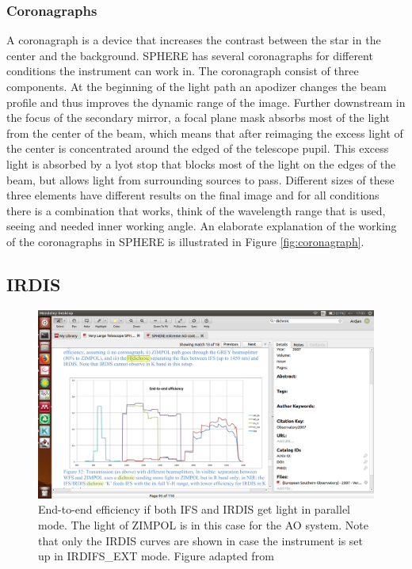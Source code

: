\documentclass[twoside,single,12pt]{lion-msc}
\begin{document}
\subsubsection{Coronagraphs}
A coronagraph is a device that increases the contrast between the star in the center and the background. SPHERE has several coronagraphs for different conditions the instrument can work in. The coronagraph consist of three components. At the beginning of the light path an apodizer changes the beam profile and thus improves the dynamic range of the image. Further downstream in the focus of the secondary mirror, a focal plane mask absorbs most of the light from the center of the beam, which means that after reimaging the excess light of the center is concentrated around the edged of the telescope pupil. This excess light is absorbed by a lyot stop that blocks most of the light on the edges of the beam, but allows light from surrounding sources to pass. Different sizes of these three elements have different results on the final image and for all conditions there is a combination that works, think of the wavelength range that is used, seeing and needed inner working angle. An elaborate explanation of the working of the coronagraphs in SPHERE is illustrated in Figure \ref{fig:coronagraph}.

\subsection{IRDIS}
\begin{figure}[!b]
\centering
\includegraphics[trim={4cm 4.3cm 16cm 9cm},clip,width = \textwidth]{systemthroughput}
\caption{End-to-end efficiency if both IFS and IRDIS get light in parallel mode. The light of ZIMPOL is in this case for the AO system. Note that only the IRDIS curves are shown in case the instrument is set up in IRDIFS\_EXT mode. Figure adapted from \cite{Observatory2007}}
\label{fig:systemthrougput}
\end{figure}
\end{document}
